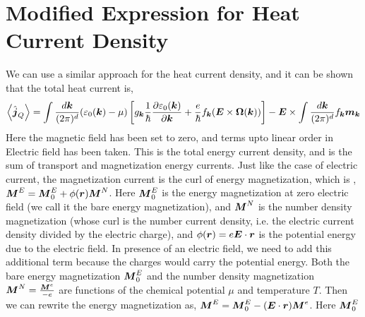 \documentclass{report}
\renewcommand\vec[1]{\ensuremath\boldsymbol{#1}} %
\begin{document}
\section{Modified Expression for Heat Current Density}
We can use a similar approach for the heat current density, and it can be shown that \cite{PhysRevLett.97.026603} the total heat current is,
\begin{equation} \label{Eq:heat-current-simplified-including-magnetization}
	\expval{\hat{\vec{j}}_Q} = \int \frac{d\vec{k}}{(2\pi)^d} (\varepsilon_0(\vec{k}) - \mu) \left[ {g}_{\vec{k}} \frac{1}{\hbar} \frac{\partial \varepsilon_0(\vec{k})}{\partial \vec{k}} + \frac{e}{\hbar} {f}_{\vec{k}} (\vec{E}\times\vec{\Omega}(\vec{k}))\right]
	- \vec{E} \times \int \frac{d\vec{k}}{(2\pi)^d}
	 f_{\vec{k}} \vec{m}_{\vec{k}}
\end{equation}
Here the magnetic field has been set to zero, and terms upto linear order in Electric field has been taken. This is the total energy current density, and is the sum of transport and magnetization energy currents. Just like the case of electric current, the magnetization current is the curl of energy magnetization, which is \cite{CooperHalperin1997}, $\vec{M}^E = \vec{M}_0^E + \phi(\vec{r}) \vec{M}^N$. Here $\vec{M}_0^E$ is the energy magnetization at zero electric field (we call it the bare energy magnetization), and $\vec{M}^N$ is the number density magnetization (whose curl is the number current density, i.e. the electric current density divided by the electric charge), and $\phi(\vec{r}) = e \vec{E} \cdot \vec{r}$ is the potential energy due to the electric field. In presence of an electric field, we need to add this additional term because the charges would carry the potential energy. Both the bare energy magnetization $\vec{M}_0^E$ and the number density magnetization $\vec{M}^N = \frac{\vec{M}^e}{-e}$ are functions of the chemical potential $\mu$ and temperature $T$. Then we can rewrite the energy magnetization as, $\vec{M}^E = \vec{M}_0^E - (\vec{E}\cdot\vec{r}) \vec{M}^e$. Here $\vec{M}_0^E$
\end{document}
